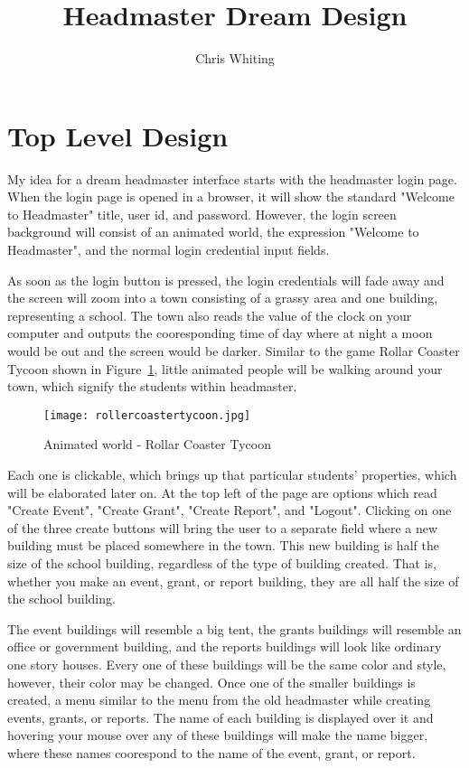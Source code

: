 \documentclass[11pt]{article}
\title{Headmaster Dream Design}
\author{Chris Whiting}
\begin{document}
\maketitle

 
\section{Top Level Design}
My idea for a dream headmaster interface starts with the headmaster login page. When the login page is opened in a browser, it will show the standard "Welcome to Headmaster" title, user id, and password. However, the login screen background will consist of an animated world, the expression "Welcome to Headmaster", and the normal login credential input fields.

As soon as the login button is pressed, the login credentials will fade away and the screen will zoom into a town consisting of a grassy area and one building, representing a school. The town also reads the value of the clock on your computer and outputs the cooresponding time of day where at night a moon would be out and the screen would be darker. Similar to the game Rollar Coaster Tycoon shown in Figure~\ref{RCT}, little animated people will be walking around your town, which signify the students within headmaster.

\begin{figure}
\centering
\texttt{[image: rollercoastertycoon.jpg]}
\caption{Animated world - Rollar Coaster Tycoon}
\label{RCT}
\end{figure}

 Each one is clickable, which brings up that particular students' properties, which will be elaborated later on. At the top left of the page are options which read "Create Event", "Create Grant", "Create Report", and "Logout". Clicking on one of the three create buttons will bring the user to a separate field where a new building must be placed somewhere in the town. This new building is half the size of the school building, regardless of the type of building created. That is, whether you make an event, grant, or report building, they are all half the size of the school building. 

The event buildings will resemble a big tent, the grants buildings will resemble an office or government building, and the reports buildings will look like ordinary one story houses. Every one of these buildings will be the same color and style, however, their color may be changed. Once one of the smaller buildings is created, a menu similar to the menu from the old headmaster while creating events, grants, or reports. The name of each building is displayed over it and hovering your mouse over any of these buildings will make the name bigger, where these names coorespond to the name of the event, grant, or report.
\end{document}
